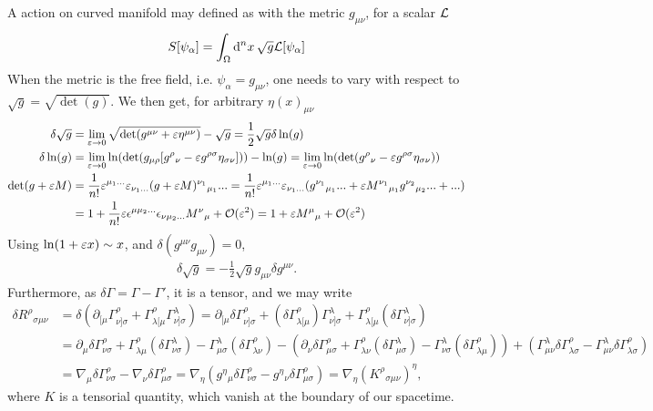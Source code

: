 A action on curved manifold may defined as with the metric $g_{\mu \nu}$, for a scalar $\mathcal L$
\begin{equation*}
    S[\psi_\alpha] = \int_\Omega \mathrm{d}^nx \, \sqrt{g}\mathcal L[\psi_\alpha] 
\end{equation*}
When the metric is the free field, i.e. $\psi_\alpha = g_{\mu \nu}$, one needs to vary with respect to $\sqrt{g} = \sqrt{\det(g)}$. We then get, for arbitrary $\eta(x)_{\mu \nu}$
\begin{align*}
    \delta \sqrt{g} &
    = \lim_{\varepsilon \rightarrow 0 } \sqrt{\det(g^{\mu \nu} + \varepsilon \eta^{\mu \nu})} - \sqrt{g} 
    = \frac{1}{2}\sqrt{g} \delta \ln(g) \\
    \delta \ln(g) &
    = \lim_{\varepsilon \rightarrow 0 } \ln(\det(g_{\mu \rho} [g^\rho{}_\nu - \varepsilon g^{\rho\sigma} \eta_{\sigma \nu}])) - \ln(g)
    = \lim_{\varepsilon \rightarrow 0 } \ln(\det(g^\rho{}_\nu - \varepsilon g^{\rho\sigma} \eta_{\sigma \nu})) \\
    \det(g + \varepsilon M) &
    = \frac{1}{n!}\varepsilon^{\mu_1...}\varepsilon_{\nu_1...}(g + \varepsilon M)^{\nu_1}{}_{\mu_1} ... 
    = \frac{1}{n!}\varepsilon^{\mu_1...}\varepsilon_{\nu_1...} (g^{\nu_1}{}_{\mu_1} ... + \varepsilon M^{\nu_1}{}_{\mu_1}  g^{\nu_2}{}_{\mu_2}...  + ...)\\
   & = 1 + \frac{1}{n!} \varepsilon \epsilon^{\mu \mu_2...} \epsilon_{\nu \mu_2...} M^\nu{}_\mu  + \mathcal{O}(\varepsilon^2)
   = 1 + \varepsilon M^{\mu}{}_{\mu}  + \mathcal{O}(\varepsilon^2)
   \end{align*}
   Using $\ln(1 + \varepsilon x) \sim x$, and $\delta( g^{\mu\nu} g_{\mu\nu}) = 0$,
   \begin{align*}
   \delta \sqrt{g} =  -\frac{1}{2} \sqrt{g} g_{\mu \nu} \delta g^{\mu \nu}.
\end{align*}
Furthermore, as $\delta \Gamma = \Gamma - \Gamma'$, it is a tensor, and we may write
\begin{align*}
    \delta R^\rho{}_{\sigma \mu \nu} 
    & = \delta(\partial_{[\mu} \Gamma^\rho_{\nu] \sigma} + \Gamma^\rho_{\lambda [\mu} \Gamma^\lambda_{\nu] \sigma})
    = \partial_{[\mu} \delta \Gamma^\rho_{\nu] \sigma} + (\delta \Gamma^\rho_{\lambda [\mu}) \Gamma^\lambda_{\nu] \sigma} + \Gamma^\rho_{\lambda [\mu}(\delta \Gamma^\lambda_{\nu] \sigma}) \\
    & = \partial_{\mu} \delta \Gamma^\rho_{\nu \sigma}  + \Gamma^\rho_{\lambda \mu}(\delta \Gamma^\lambda_{\nu \sigma}) - \Gamma^\lambda_{\mu \sigma}   (\delta \Gamma^\rho_{\lambda \nu}) - \left( \partial_{\nu} \delta \Gamma^\rho_{\mu \sigma}  + \Gamma^\rho_{\lambda \nu}(\delta \Gamma^\lambda_{\mu \sigma}) - \Gamma^\lambda_{\nu \sigma}   (\delta \Gamma^\rho_{\lambda \mu}) \right) + (\Gamma^{\lambda}_{\mu\nu}\delta\Gamma^\rho_{\lambda \sigma} - \Gamma^{\lambda}_{\mu\nu}\delta\Gamma^\rho_{\lambda \sigma}) \\
    & = \nabla_{\mu}\delta \Gamma^\rho_{\nu \sigma} - \nabla_{\nu}\delta \Gamma^\rho_{\mu \sigma}
     = \nabla_\eta \left(g^\eta{}_{\mu} \delta\Gamma^\rho_{\nu \sigma} - g^\eta{}_{\nu} \delta\Gamma^\rho_{\mu \sigma} \right) 
    = \nabla_\eta (K^\rho{}_{\sigma \mu \nu})^\eta,
\end{align*}
where $K$ is a tensorial quantity, which vanish at the boundary of our spacetime.





